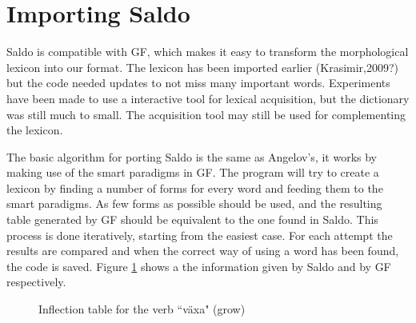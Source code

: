 \documentclass{report}
\begin{document}
\section{Importing Saldo}
\label{sec:prog.saldo}
Saldo is compatible with GF, which makes it easy to transform the morphological
lexicon into our format. The lexicon has been imported earlier (Krasimir,2009?)
but the code needed updates to not miss many important words.
Experiments have been made to use a interactive tool for lexical acquisition,
but the dictionary was still much to small. The acquisition tool may still
be used for complementing the lexicon.

The basic algorithm for porting Saldo is the same as Angelov's, it works by
making use of the smart paradigms in GF.
The program will try to create a lexicon by finding a number of forms for every
word and feeding them to the smart paradigms. As few forms as possible should be
used, and the resulting table generated by GF should be equivalent to the one found
in Saldo. This process is done iteratively,
starting from the easiest case. For each attempt the results are compared and when
the correct way of using a word has been found, the code is saved.
Figure \ref{pic:TabVax} shows a the information given by Saldo and by GF respectively.\\
\begin{figure}[h]
  \begin{center}
\hspace{5mm}
\caption{Inflection table for the verb ``växa" (grow)}
\label{pic:TabVax}
  \end{center}
\end{figure}
\end{document}
